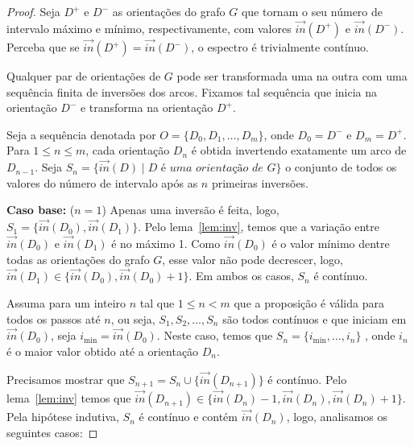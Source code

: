 \begin{proof}
  Seja $D^+$ e $D^-$ as orientações do grafo $G$ que tornam o seu número de intervalo máximo e mínimo, respectivamente, com valores $\overrightarrow{in}(D^+)$ e $\overrightarrow{in}(D^-)$. Perceba que se $\overrightarrow{in}(D^+) = \overrightarrow{in}(D^-)$, o espectro é trivialmente contínuo.

  Qualquer par de orientações de $G$ pode ser transformada uma na outra com uma sequência finita de inversões dos arcos. Fixamos tal sequência que inicia na orientação $D^-$ e transforma na orientação $D^+$.

  Seja a sequência denotada por $O = \{D_0, D_1, \ldots, D_m\}$, onde $D_0 = D^-$ e $D_m = D^+$. Para $1 \leq n \leq m$, cada orientação $D_n$ é obtida invertendo exatamente um arco de $D_{n-1}$. Seja $S_{n} = \{\overrightarrow{in}(D) \mid \textit{D é uma orientação de G}\}$ o conjunto de todos os valores do número de intervalo após as $n$ primeiras inversões.

  \noindent \textbf{Caso base:} ($n = 1$) Apenas uma inversão é feita, logo, $S_1 = \{\overrightarrow{in}(D_0), \overrightarrow{in}(D_1)\}$. Pelo lema~\ref{lem:inv}, temos que a variação entre $\overrightarrow{in}(D_0)$ e $\overrightarrow{in}(D_1)$ é no máximo 1. Como $\overrightarrow{in}(D_0)$ é o valor mínimo dentre todas as orientações do grafo $G$, esse valor não pode decrescer, logo, $\overrightarrow{in}(D_1) \in \{\overrightarrow{in}(D_0), \overrightarrow{in}(D_0)+1\}$. Em ambos os casos, $S_n$ é contínuo.

   Assuma para um inteiro $n$ tal que $1\leq n < m$ que a proposição é válida para todos os passos até $n$, ou seja, $S_1, S_2, \ldots, S_n$ são todos contínuos e que iniciam em $\overrightarrow{in}(D_0)$, seja $i_{\min} =  \overrightarrow{in}(D_0)$. Neste caso, temos que $S_n = \{i_{\min}, \ldots, i_n\} $ , onde $i_n$ é o maior valor obtido até a orientação $D_n$.

   Precisamos mostrar que $S_{n+1} = S_n \cup \{\overrightarrow{in}(D_{n+1})\}$ é contínuo. Pelo lema~\ref{lem:inv} temos que  $\overrightarrow{in}(D_{n+1}) \in \{\overrightarrow{in}(D_{n})-1, \overrightarrow{in}(D_{n}), \overrightarrow{in}(D_{n})+1\}$. Pela hipótese indutiva, $S_n$ é contínuo e contém $\overrightarrow{in}(D_n)$, logo, analisamos os seguintes casos:


\end{proof}
